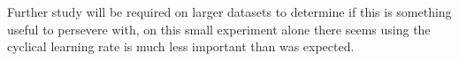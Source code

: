 Further study will be required on larger datasets to determine if this is something useful to persevere with, on this small experiment alone there seems using the cyclical learning rate is much less important than was expected.








